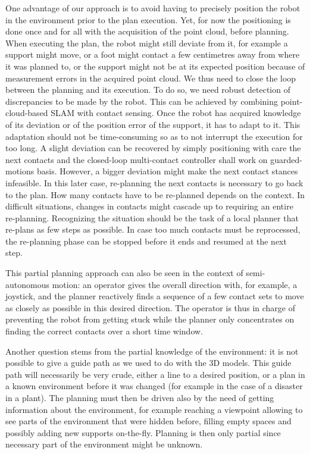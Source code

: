 One advantage of our approach is to avoid having to precisely position the robot in the environment prior to the plan execution. Yet, for now the positioning is done once and for all with the acquisition of the point cloud, before planning. When executing the plan, the robot might still deviate from it, for example a support might move, or a foot might contact a few centimetres away from where it was planned to, or the support might not be at its expected position because of measurement errors in the acquired point cloud. We thus need to close the loop between the planning and its execution. To do so, we need robust detection of discrepancies to be made by the robot. This can be achieved by combining point-cloud-based SLAM with contact sensing. Once the robot has acquired knowledge of its deviation or of the position error of the support, it has to adapt to it. This adaptation should not be time-consuming so as to not interrupt the execution for too long. A slight deviation can be recovered by simply positioning with care the next contacts and the closed-loop multi-contact controller shall work on guarded-motions basis. However, a bigger deviation might make the next contact stances infeasible. In this later case, re-planning the next contacts is necessary to go back to the plan. How many contacts have to be re-planned depends on the context. In difficult situations, changes in contacts might cascade up to requiring an entire re-planning. Recognizing the situation should be the task of a local planner that re-plans as few steps as possible. In case too much contacts must be reprocessed, the re-planning phase can be stopped before it ends and resumed at the next step.

This partial planning approach can also be seen in the context of semi-autonomous motion: an operator gives the overall direction with, for example, a joystick, and the planner reactively finds a sequence of a few contact sets to move as closely as possible in this desired direction. The operator is thus in charge of preventing the robot from getting stuck while the planner only concentrates on finding the correct contacts over a short time window.

Another question stems from the partial knowledge of the environment: it is not possible to give a guide path as we used to do with the 3D models. This guide path will necessarily be very crude, either a line to a desired position, or a plan in a known environment before it was changed (for example in the case of a disaster in a plant). The planning must then be driven also by the need of getting information about the environment, for example reaching a viewpoint allowing to see parts of the environment that were hidden before, filling empty spaces and possibly adding new supports on-the-fly. Planning is then only partial since necessary part of the environment might be unknown. 


